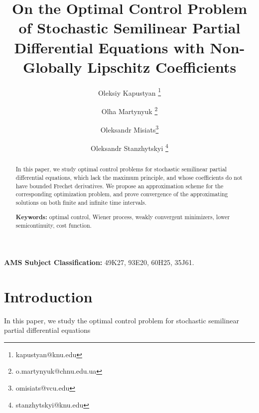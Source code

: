 \documentclass[a4paper,12pt]{article}
\numberwithin{equation}{section}
\begin{document}
\title{On the Optimal Control Problem of Stochastic Semilinear Partial Differential Equations with Non-Globally Lipschitz Coefficients}
\date{}

\author[1]{Oleksiy Kapustyan \thanks{kapustyan@knu.edu}}

\author[3] {Olha Martynyuk
\thanks{o.martynyuk@chnu.edu.ua}}

\author[2]{Oleksandr Misiats\thanks{omisiats@vcu.edu}}

\author[1]{Oleksandr Stanzhytskyi \thanks{stanzhytskyi@knu.edu}}










\maketitle

\begin{abstract}
In this paper, we study optimal control problems for stochastic
semilinear partial differential equations, which lack the maximum principle, and whose coefficients do not have bounded Frechet derivatives. We propose an approximation scheme
for the corresponding optimization problem, and prove convergence
of the approximating solutions on both finite and infinite
time intervals. 

\medskip

\noindent
\textbf{Keywords:}
optimal control,
Wiener process,
weakly convergent minimizers,
lower semicontinuity,
cost function.
\end{abstract}

\medskip

\noindent
\textbf{AMS Subject Classification:}
49K27, 93E20, 60H25, 35J61.

\section{Introduction}

In this paper, we study the optimal control problem for stochastic
semilinear partial differential equations
\end{document}
